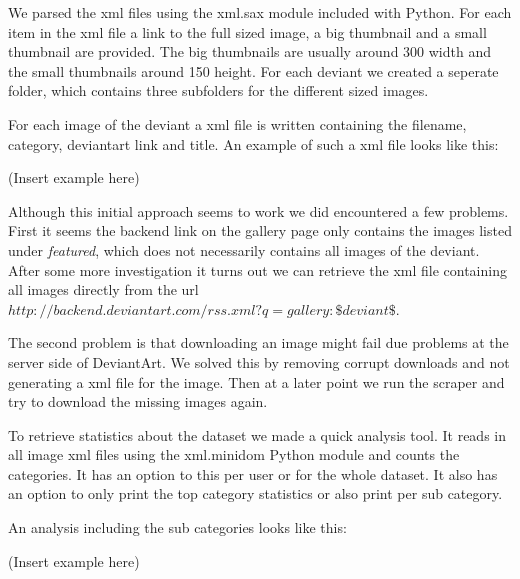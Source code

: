 We parsed the xml files using the xml.sax module included with Python. 
For each item in the xml file a link to the full sized image, a big thumbnail and 
a small thumbnail are provided. The big thumbnails are usually around 300 width and 
the small thumbnails around 150 height. For each deviant we created a seperate folder, which
contains three subfolders for the different sized images. 

For each image of the deviant a xml file is written containing the filename, category, deviantart link and title.
An example of such a xml file looks like this:

(Insert example here)

Although this initial approach seems to work we did encountered a few problems. First it
seems the backend link on the gallery page only contains the images listed under \textit{featured}, 
which does not necessarily contains all images of the deviant. After some more investigation it turns 
out we can retrieve the xml file containing all images directly from the url 
\textit{$http://backend.deviantart.com/rss.xml?q=gallery:\$deviant\$$}.

The second problem is that downloading an image might fail due problems at the server side of DeviantArt.
We solved this by removing corrupt downloads and not generating a xml file for the image. Then at a later
point we run the scraper and try to download the missing images again. 

To retrieve statistics about the dataset we made a quick analysis tool. It reads in
all image xml files using the xml.minidom Python module  and counts the categories. 
It has an option to this per user or for the whole dataset. It also has an option
to only print the top category statistics or also print per sub category.

An analysis including the sub categories looks like this:

(Insert example here)

